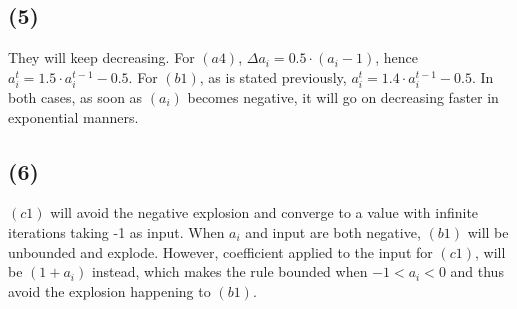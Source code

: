 \documentclass{article}
\begin{document}
\subsection*{(5)}
They will keep decreasing. For $(a4)$, $\Delta a_i = 0.5\cdot(a_i-1)$, hence
$a_i^t = 1.5\cdot a_i^{t-1} - 0.5$. For $(b1)$, as is stated previously, 
$a_i^t = 1.4\cdot a_i^{t-1} - 0.5$. In both cases, as soon as $(a_i)$ becomes
negative, it will go on decreasing faster in exponential manners.

\subsection*{(6)}
$(c1)$ will avoid the negative explosion and converge to a value with infinite
iterations taking -1 as input. When $a_i$ and input are both negative, $(b1)$ 
will be unbounded and explode. However, coefficient applied to the input for 
$(c1)$, will be $(1+a_i)$ instead, which makes the rule bounded when $-1<a_i< 0$
and thus avoid the explosion happening to $(b1)$.
\end{document}
